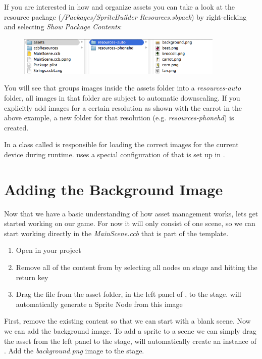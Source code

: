 \begin{details} 
If you are interested in how \SB{} and \cocos{} organize assets you can take a
look at the resource package
(\textit{/Packages/\allowbreak{}SpriteBuilder Resources\allowbreak{}.sbpack}) by
right-clicking and selecting \textit{Show Package Contents}:
\begin{figure}[H]
		\centering
		\includegraphics[width=280pt]{images/Chapter2/behindscenes_resourcepack.png}
\end{figure}
You will see that \SB{} groups images inside the assets folder into a
\textit{resources-auto} folder, all images in that folder are subject to
automatic downscaling. If you explicitly add images for a certain resolution as
shown with the carrot in the above example, a new folder for that resolution
(e.g. \textit{resources-phonehd}) is created.

In \cocos{} a class called  is responsible for loading
the correct images for the current device during runtime. \SB{} uses a special
configuration of  that is set up in
. 
\end{details}

\section{Adding the Background Image}
Now that we have a basic understanding of how asset management works, lets get
started working on our game. For now it will only consist of one scene, so
we can start working directly in the \textit{MainScene.ccb} that is part of the
\SB{} template. 

\begin{leftbar}
\begin{enumerate}
  \item Open  in your \SB{} project
  \item Remove all of the content from  by selecting
  all nodes on stage and hitting the return key
  \item Drag the  file from the asset folder, in the
  left panel of \SB{}, to the stage. \SB{} will automatically generate a Sprite
  Node from this image
\end{enumerate}
First, remove the existing content so that we can start with a blank
scene. Now we can add the background image. To add a sprite to a scene we can
simply drag the asset from the left panel to the stage, \SB{} will
automatically create an instance of \ccsprite{}. Add the \textit{background.png} image to the stage.
\end{leftbar}

